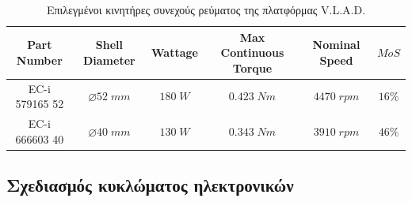 \begin{table}[H]
    \centering
        \begin{tabular}{|c|c|c|c|c|c|}
        \hline
        \rowcolor{Dandelion}
        Part Number & Shell Diameter & Wattage  & Max Continuous Torque & Nominal Speed & $MoS$\\
        \hline
        EC-i 579165 52 & $\varnothing 52\;mm$ &$180\; W$ & $0.423\; Nm$ & $4470\; rpm$ & $16\%$\\
        \hline
        EC-i 666603 40 & $\varnothing 40\;mm$ &$130\; W$ & $0.343\; Nm$ & $3910\; rpm$ & $46\%$ \\
        \hline
        \end{tabular}
    \caption{Επιλεγμένοι κινητήρες συνεχούς ρεύματος της πλατφόρμας V.L.A.D.}
    \label{tab:motors}
\end{table}






\subsection{Σχεδιασμός κυκλώματος ηλεκτρονικών}

